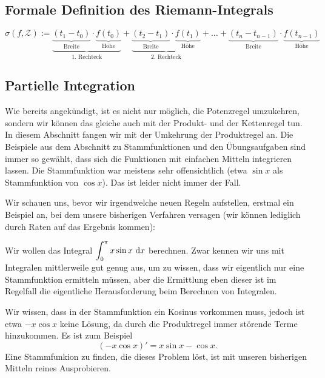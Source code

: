 \documentclass[../../main.tex]{subfiles}
\begin{document}
\subsection*{Formale Definition des Riemann-Integrals}
\label{riemannintegral-richtig}
\[\sigma(f,\mathcal{Z}):=\underbrace{\underbrace{(t_1-t_0)}_{\text{Breite}}\cdot \underbrace{f(t_0)}_{\text{Höhe}}}_{\text{1. Rechteck}}+\underbrace{\underbrace{(t_2-t_1)}_{\text{Breite}}\cdot \underbrace{f(t_1)}_{\text{Höhe}}}_{\text{2. Rechteck}}+\dots+\underbrace{(t_n-t_{n-1})}_{\text{Breite}}\cdot \underbrace{f(t_{n-1})}_{\text{Höhe}}\]    

\subsection*{Partielle Integration}
\label{partielle-integration}
Wie bereits angekündigt, ist es nicht nur möglich, die Potenzregel umzukehren, sondern wir können das gleiche auch
mit der Produkt- und der Kettenregel tun. In diesem Abschnitt fangen wir mit der Umkehrung der Produktregel an. Die
Beispiele aus dem Abschnitt zu Stammfunktionen und den Übungsaufgaben sind immer so gewählt, dass sich die Funktionen
mit einfachen Mitteln integrieren lassen. Die Stammfunktion war meistens sehr offensichtlich (etwa $\sin x$ als Stammfunktion 
von $\cos x$). Das ist leider nicht immer der Fall.

Wir schauen uns, bevor wir irgendwelche neuen Regeln aufstellen, erstmal ein Beispiel an, bei dem unsere bisherigen Verfahren 
versagen (wir können lediglich durch Raten auf das Ergebnis kommen):
\begin{example}{}
    Wir wollen das Integral $\displaystyle\int_0^\pi x\sin x\mathop{}\mathrm{d} x$ berechnen. Zwar kennen wir uns mit Integralen 
    mittlerweile gut genug aus, um zu wissen, dass wir eigentlich nur eine Stammfunktion ermitteln müssen, aber die 
    Ermittlung eben dieser ist im Regelfall die eigentliche Herausforderung beim Berechnen von Integralen.

    Wir wissen, dass in der Stammfunktion ein Kosinus vorkommen muss, jedoch ist etwa $-x\cos x$ keine Lösung, da durch
    die Produktregel immer störende Terme hinzukommen. Es ist zum Beispiel
    \[(-x\cos x)'=x\sin x-\cos x.\]
    Eine Stammfunkion zu finden, die dieses Problem löst, ist mit unseren bisherigen Mitteln reines Ausprobieren.
\end{example}
\end{document}

